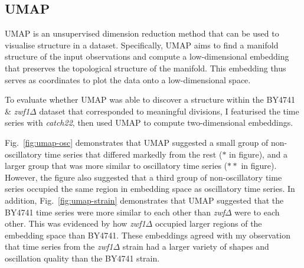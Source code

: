 \subsection{UMAP}
\label{subsec:analysis-clustering-umap}

UMAP \parencite{mcinnesUMAPUniformManifold2020} is an unsupervised dimension reduction method that can be used to visualise structure in a dataset.
Specifically, UMAP aims to find a manifold structure of the input observations and compute a low-dimensional embedding that preserves the topological structure of the manifold.
This embedding thus serves as coordinates to plot the data onto a low-dimensional space.

To evaluate whether UMAP was able to discover a structure within the BY4741 \& \textit{zwf1$\Delta$} dataset that corresponded to meaningful divisions, I featurised the time series with \textit{catch22}, then used UMAP to compute two-dimensional embeddings.

Fig.\ \ref{fig:umap-osc} demonstrates that UMAP suggested a small group of non-oscillatory time series that differed markedly from the rest ($\ast$ in figure), and a larger group that was more similar to oscillatory time series ($\ast \ast$ in figure).
However, the figure also suggested that a third group of non-oscillatory time series occupied the same region in embedding space as oscillatory time series.
In addition, Fig.\ \ref{fig:umap-strain} demonstrates that UMAP suggested that the BY4741 time series were more similar to each other than \textit{zwf$\Delta$} were to each other.
This was evidenced by how \textit{zwf1$\Delta$} occupied larger regions of the embedding space than BY4741.
These embeddings agreed with my observation that time series from the \textit{zwf1$\Delta$} strain had a larger variety of shapes and oscillation quality than the BY4741 strain.

